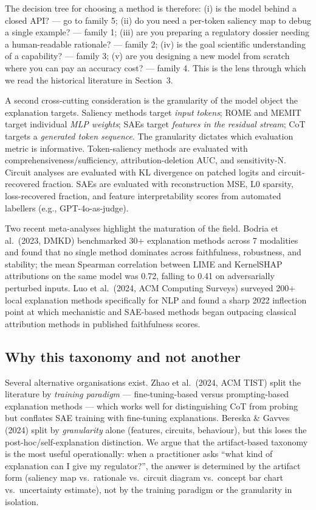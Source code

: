 \documentclass{article}
\begin{document}
The decision tree for choosing a method is therefore: (i) is the model behind a closed API? --- go to family 5; (ii) do you need a per-token saliency map to debug a single example? --- family 1; (iii) are you preparing a regulatory dossier needing a human-readable rationale? --- family 2; (iv) is the goal scientific understanding of a capability? --- family 3; (v) are you designing a new model from scratch where you can pay an accuracy cost? --- family 4. This is the lens through which we read the historical literature in Section~3.

A second cross-cutting consideration is the granularity of the model object the explanation targets. Saliency methods target \emph{input tokens}; ROME and MEMIT target individual \emph{MLP weights}; SAEs target \emph{features in the residual stream}; CoT targets a \emph{generated token sequence}. The granularity dictates which evaluation metric is informative. Token-saliency methods are evaluated with comprehensiveness/sufficiency, attribution-deletion AUC, and sensitivity-N. Circuit analyses are evaluated with KL divergence on patched logits and circuit-recovered fraction. SAEs are evaluated with reconstruction MSE, L0 sparsity, loss-recovered fraction, and feature interpretability scores from automated labellers (e.g., GPT-4o-as-judge).

Two recent meta-analyses highlight the maturation of the field. Bodria et al.~(2023, DMKD) benchmarked 30+ explanation methods across 7 modalities and found that no single method dominates across faithfulness, robustness, and stability; the mean Spearman correlation between LIME and KernelSHAP attributions on the same model was 0.72, falling to 0.41 on adversarially perturbed inputs. Luo et al.~(2024, ACM Computing Surveys) surveyed 200+ local explanation methods specifically for NLP and found a sharp 2022 inflection point at which mechanistic and SAE-based methods began outpacing classical attribution methods in published faithfulness scores.

\subsection{Why this taxonomy and not another}\label{why-this-taxonomy-and-not-another}

Several alternative organisations exist. Zhao et al.~(2024, ACM TIST) split the literature by \emph{training paradigm} --- fine-tuning-based versus prompting-based explanation methods --- which works well for distinguishing CoT from probing but conflates SAE training with fine-tuning explanations. Bereska \& Gavves (2024) split by \emph{granularity} alone (features, circuits, behaviour), but this loses the post-hoc/self-explanation distinction. We argue that the artifact-based taxonomy is the most useful operationally: when a practitioner asks ``what kind of explanation can I give my regulator?'', the answer is determined by the artifact form (saliency map vs.~rationale vs.~circuit diagram vs.~concept bar chart vs.~uncertainty estimate), not by the training paradigm or the granularity in isolation.
\end{document}
